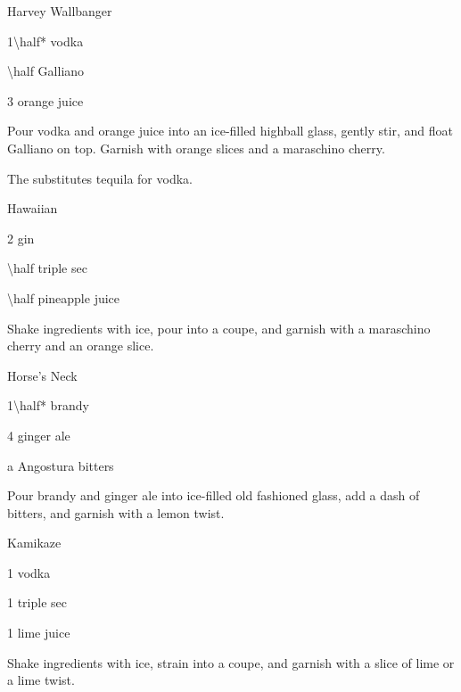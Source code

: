 \begin{Cocktail}{Harvey Wallbanger}
	\begin{Ingredients}
	\item \SI{1\half*}{\oz} vodka
	\item \SI{\half}{\oz} Galliano
	\item \SI{3}{\oz} orange juice
	\end{Ingredients}
	
	\begin{Instructions}
	Pour vodka and orange juice into an ice-filled highball glass, gently stir, and float Galliano on top.  Garnish with orange slices and a maraschino cherry.
	
	The  substitutes tequila for vodka.
	\end{Instructions}
\end{Cocktail}

\begin{Cocktail}{Hawaiian}
	\begin{Ingredients}
	\item \SI{2}{\oz} gin
	\item \SI{\half}{\oz} triple sec
	\item \SI{\half}{\oz} pineapple juice
	\end{Ingredients}
	
	\begin{Instructions}
	Shake ingredients with ice, pour into a coupe, and garnish with a maraschino cherry and an orange slice.
	\end{Instructions}
\end{Cocktail}

\begin{Cocktail}{Horse's Neck}
	\begin{Ingredients}
	\item \SI{1\half*}{\oz} brandy
	\item \SI{4}{\oz} ginger ale
	\item a \si{\dash} Angostura bitters
	\end{Ingredients}
	
	\begin{Instructions}
	Pour brandy and ginger ale into ice-filled old fashioned glass, add a dash of bitters, and garnish with a lemon twist.
	\end{Instructions}
\end{Cocktail}

\begin{Cocktail}{Kamikaze}
	\begin{Ingredients}
	\item \SI{1}{\oz} vodka
	\item \SI{1}{\oz} triple sec
	\item \SI{1}{\oz} lime juice
	\end{Ingredients}
	
	\begin{Instructions}
	Shake ingredients with ice, strain into a coupe, and garnish with a slice of lime or a lime twist.
	\end{Instructions}
\end{Cocktail}

